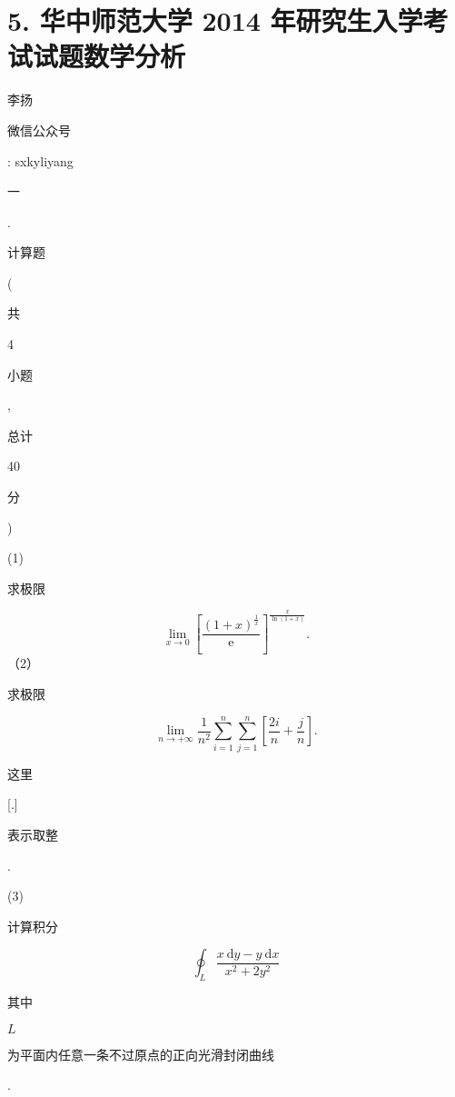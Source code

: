\documentclass[10pt]{article}
\begin{document}
\section{5. 华中师范大学 2014 年研究生入学考试试题数学分析}
\begin{CJK}{UTF8}{mj}李扬\end{CJK}

\begin{CJK}{UTF8}{mj}微信公众号\end{CJK}: sxkyliyang

\begin{CJK}{UTF8}{mj}一\end{CJK}. \begin{CJK}{UTF8}{mj}计算题\end{CJK}(\begin{CJK}{UTF8}{mj}共\end{CJK} 4 \begin{CJK}{UTF8}{mj}小题\end{CJK}, \begin{CJK}{UTF8}{mj}总计\end{CJK} 40 \begin{CJK}{UTF8}{mj}分\end{CJK})

(1) \begin{CJK}{UTF8}{mj}求极限\end{CJK}
$$
\lim _{x \rightarrow 0}\left[\frac{(1+x)^{\frac{1}{x}}}{\mathrm{e}}\right]^{\frac{x}{\ln (1+x)}} .
$$
（2）\begin{CJK}{UTF8}{mj}求极限\end{CJK}
$$
\lim _{n \rightarrow+\infty} \frac{1}{n^{2}} \sum_{i=1}^{n} \sum_{j=1}^{n}\left[\frac{2 i}{n}+\frac{j}{n}\right] .
$$
\begin{CJK}{UTF8}{mj}这里\end{CJK} [.] \begin{CJK}{UTF8}{mj}表示取整\end{CJK}.

(3) \begin{CJK}{UTF8}{mj}计算积分\end{CJK}
$$
\oint_{L} \frac{x \mathrm{~d} y-y \mathrm{~d} x}{x^{2}+2 y^{2}}
$$
\begin{CJK}{UTF8}{mj}其中\end{CJK} $L$ \begin{CJK}{UTF8}{mj}为平面内任意一条不过原点的正向光滑封闭曲线\end{CJK}.
\end{document}
